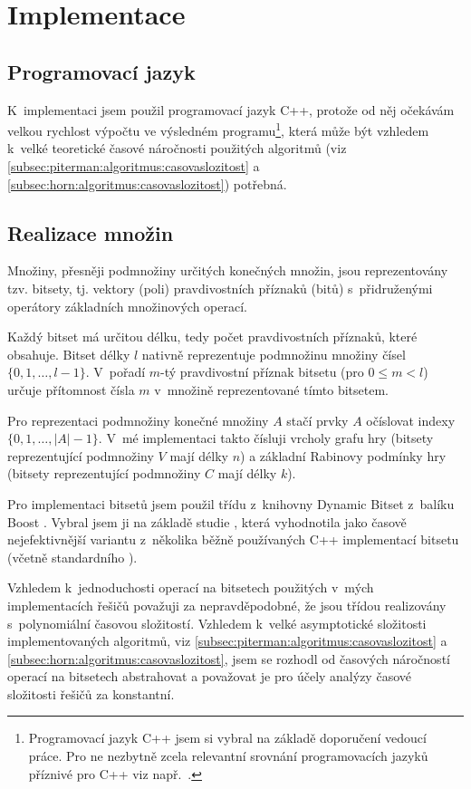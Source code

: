 \chapter{Implementace} \label{chap:implementation}
\section{Programovací jazyk}
K~implementaci jsem použil programovací jazyk C++, protože od něj očekávám velkou rychlost výpočtu ve výsledném programu\footnote{Programovací jazyk C++ jsem si vybral na základě doporučení vedoucí práce. Pro ne nezbytně zcela relevantní srovnání  programovacích jazyků příznivé pro C++ viz např.~\cite{Cowell-Shah2004}.}, která může být vzhledem k~velké teoretické časové náročnosti použitých algoritmů (viz \ref{subsec:piterman:algoritmus:casovaslozitost} a \ref{subsec:horn:algoritmus:casovaslozitost}) potřebná.
\section{Realizace množin}
Množiny, přesněji podmnožiny určitých konečných množin, jsou reprezentovány tzv. bitsety, tj. vektory (poli) pravdivostních příznaků (bitů) s~přidruženými operátory základních množinových operací.

Každý bitset má určitou délku, tedy počet pravdivostních příznaků, které obsahuje. Bitset délky $l$ nativně reprezentuje podmnožinu množiny čísel $\{0, 1, \dotsc, l-1\}$. V~pořadí $m$-tý pravdivostní příznak bitsetu (pro $0 \leq m < l$) určuje přítomnost čísla $m$ v~množině reprezentované tímto bitsetem.

Pro reprezentaci podmnožiny konečné množiny $A$ stačí prvky $A$ očíslovat indexy $\{0, 1, \dotsc, |A|-1\}$. V~mé implementaci takto čísluji vrcholy grafu hry (bitsety reprezentující podmnožiny $V$ mají délky $n$) a základní Rabinovy podmínky hry (bitsety reprezentující podmnožiny $C$ mají délky $k$).

Pro implementaci bitsetů jsem použil třídu   z~knihovny Dynamic Bitset \cite{Siek2008} z~balíku Boost \cite{Boost}. Vybral jsem ji na základě studie \cite{Pieterse2010}, která  vyhodnotila jako časově nejefektivnější variantu z~několika běžně používaných C++ implementací bitsetu (včetně standardního  ).

Vzhledem k~jednoduchosti operací na bitsetech použitých v~mých implementacích řešičů považuji za nepravděpodobné, že jsou třídou  realizovány s~polynomiální časovou složitostí. Vzhledem k~velké asymptotické složitosti implementovaných algoritmů, viz \ref{subsec:piterman:algoritmus:casovaslozitost} a \ref{subsec:horn:algoritmus:casovaslozitost}, jsem se rozhodl od časových náročností operací na bitsetech abstrahovat a považovat je pro účely analýzy časové složitosti řešičů za konstantní.
